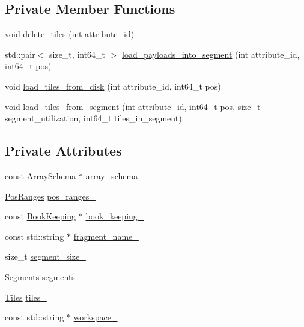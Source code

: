 \subsection*{Private Member Functions}
\begin{DoxyCompactItemize}
\item 
void \hyperlink{classReadState_a923346fc533bd2917ce20b6488603e39}{delete\+\_\+tiles} (int attribute\+\_\+id)
\item 
std\+::pair$<$ size\+\_\+t, int64\+\_\+t $>$ \hyperlink{classReadState_a50b9f02f9ee47bc3d811350b2a8fdaa9}{load\+\_\+payloads\+\_\+into\+\_\+segment} (int attribute\+\_\+id, int64\+\_\+t pos)
\item 
void \hyperlink{classReadState_ab3282649fc2325ecfc92dfac954b0262}{load\+\_\+tiles\+\_\+from\+\_\+disk} (int attribute\+\_\+id, int64\+\_\+t pos)
\item 
void \hyperlink{classReadState_addf5d47d7afb67c0f6607aebabb0ef3e}{load\+\_\+tiles\+\_\+from\+\_\+segment} (int attribute\+\_\+id, int64\+\_\+t pos, size\+\_\+t segment\+\_\+utilization, int64\+\_\+t tiles\+\_\+in\+\_\+segment)
\end{DoxyCompactItemize}
\subsection*{Private Attributes}
\begin{DoxyCompactItemize}
\item 
const \hyperlink{classArraySchema}{Array\+Schema} $\ast$ \hyperlink{classReadState_a82f571fce01a7869f065ac7cad996c56}{array\+\_\+schema\+\_\+}
\item 
\hyperlink{classReadState_a83c1f880e2c8bf77f3aa57262bb31043}{Pos\+Ranges} \hyperlink{classReadState_aedc33e4b6a486f30e0a0c4d40175d3dd}{pos\+\_\+ranges\+\_\+}
\item 
const \hyperlink{classBookKeeping}{Book\+Keeping} $\ast$ \hyperlink{classReadState_a5c8c6992cbec935ae0105bdd32d393d8}{book\+\_\+keeping\+\_\+}
\item 
const std\+::string $\ast$ \hyperlink{classReadState_aeacb54ee4e3a49b76f5099d429b6a052}{fragment\+\_\+name\+\_\+}
\item 
size\+\_\+t \hyperlink{classReadState_ace4b01c72d47f9cf2eaa10e2e4628696}{segment\+\_\+size\+\_\+}
\item 
\hyperlink{classReadState_a0c5d7b8fb9e545e2f1801f9acdedd45e}{Segments} \hyperlink{classReadState_a6037655555de80978e7139ad835182e9}{segments\+\_\+}
\item 
\hyperlink{classReadState_a622db54fa71351c2c36d4a1dcd872225}{Tiles} \hyperlink{classReadState_a5b4ee76ddc26b1b5d7fd36f0695bc31f}{tiles\+\_\+}
\item 
const std\+::string $\ast$ \hyperlink{classReadState_a575195a908596181416a7ea0c5b45eeb}{workspace\+\_\+}
\end{DoxyCompactItemize}


